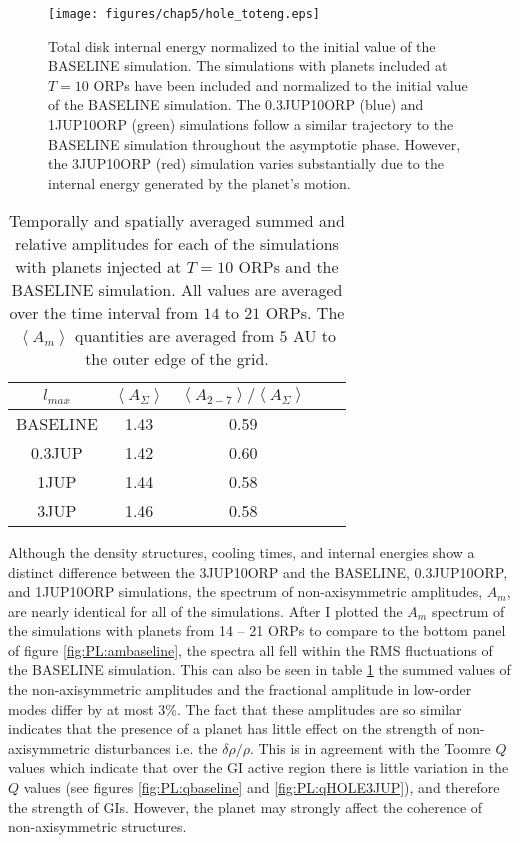 \begin{figure}[p]
\centering
\texttt{[image: figures/chap5/hole\_toteng.eps]}
\caption[NEED TAGLINE]{Total disk internal energy normalized to the initial value of the BASELINE simulation. The simulations with planets included at $T = 10$ ORPs have been included and normalized to the initial value of the BASELINE simulation. The 0.3JUP10ORP (blue) and 1JUP10ORP (green) simulations follow a similar trajectory to the BASELINE simulation throughout the asymptotic phase. However, the 3JUP10ORP (red) simulation varies substantially due to the internal energy generated by the planet's motion.}
\label{fig:PL:enghole}
\end{figure}

\begin{table}
\centering
\renewcommand{\arraystretch}{1.25}
\begin{tabular*}{0.75\textwidth}{@{\extracolsep{\fill}}ccccc}
\hline
$l_{max}$&$\left<A_\Sigma\right>$&$\left<A_{2-7}\right>/\left<A_\Sigma\right>$\\
\hline\hline  
BASELINE&1.43&0.59\\ 
0.3JUP&1.42&0.60\\ 
1JUP&1.44&0.58\\ 
3JUP&1.46&0.58\\
\hline
\end{tabular*}
\vspace{0.1in}
\caption[NEED TAGLINE]{Temporally and spatially averaged summed and relative amplitudes for each of the simulations with planets injected at $T = 10$ ORPs and the BASELINE simulation. All values are averaged over the time interval from $14$ to $21$ ORPs. The $\left<A_m\right>$ quantities are averaged from $5$ AU to the outer edge of the grid.}
\label{tbl:PL:amhole}
\end{table} 
\renewcommand{\arraystretch}{1}

Although the density structures, cooling times, and internal energies show a distinct difference between the 3JUP10ORP and the BASELINE, 0.3JUP10ORP, and 1JUP10ORP simulations, the spectrum of non-axisymmetric amplitudes, $A_m$, are nearly identical for all of the simulations. After I plotted the $A_m$ spectrum of the simulations with planets from 14 -- 21 ORPs to compare to the bottom panel of figure \ref{fig:PL:ambaseline}, the spectra all fell within the RMS fluctuations of the BASELINE simulation. This can also be seen in table \ref{tbl:PL:amhole} the summed values of the non-axisymmetric amplitudes and the fractional amplitude in low-order modes differ by at most 3\%. The fact that these amplitudes are so similar indicates that the presence of a planet has little effect on the strength of non-axisymmetric disturbances i.e. the $\delta \rho/ \rho$. This is in agreement with the Toomre $Q$ values which indicate that over the GI active region there is little variation in the $Q$ values (see figures \ref{fig:PL:qbaseline} and \ref{fig:PL:qHOLE3JUP}), and therefore the strength of GIs. However, the planet may strongly affect the coherence of non-axisymmetric structures.

